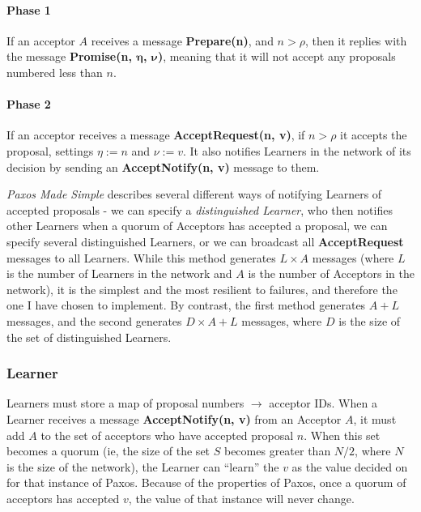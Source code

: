 \documentclass[12pt,twoside,notitlepage]{report}
\newcommand{\msg}[1] {{\bf #1}}         %
\begin{document}
\paragraph{Phase 1}

If an acceptor $A$ receives a message \msg{Prepare(n)}, and $n > \rho$, then it replies with the
message \msg{Promise(n, $\bm{\eta}$, $\bm{\nu}$)}, meaning that it will not accept any proposals
numbered less than $n$.

\paragraph{Phase 2}

If an acceptor receives a message \msg{AcceptRequest(n, v)}, if $n > \rho$ it accepts the
proposal, settings $\eta := n$ and $\nu := v$. It also notifies Learners in the network of its
decision by sending an \msg{AcceptNotify(n, v)} message to them.

\emph{Paxos Made Simple} \cite{lamport01} describes several different ways of notifying Learners
of accepted proposals - we can specify a \emph{distinguished Learner}, who then notifies
other Learners when a quorum of Acceptors has accepted a proposal, we can specify several
distinguished Learners, or we can broadcast all \msg{AcceptRequest} messages to all Learners.
While this method generates $L\times A$ messages (where $L$ is the number of Learners in the
network and $A$ is the number of Acceptors in the network), it is the simplest and the most
resilient to failures, and therefore the one I have chosen to implement. By contrast, the first
method generates $A + L$ messages, and the second generates $D\times A + L$ messages, where $D$ is
the size of the set of distinguished Learners.

\subsubsection*{Learner}

Learners must store a map of proposal numbers $\rightarrow$ acceptor IDs. When a Learner receives a
message \msg{AcceptNotify(n, v)} from an Acceptor $A$, it must add $A$ to the set of acceptors who
have accepted proposal $n$. When this set becomes a quorum (ie, the size of the set $S$ becomes
greater than $N / 2$, where $N$ is the size of the network), the Learner can ``learn'' the $v$ as
the value decided on for that instance of Paxos. Because of the properties of Paxos, once a quorum
of acceptors has accepted $v$, the value of that instance will never change.
\end{document}
